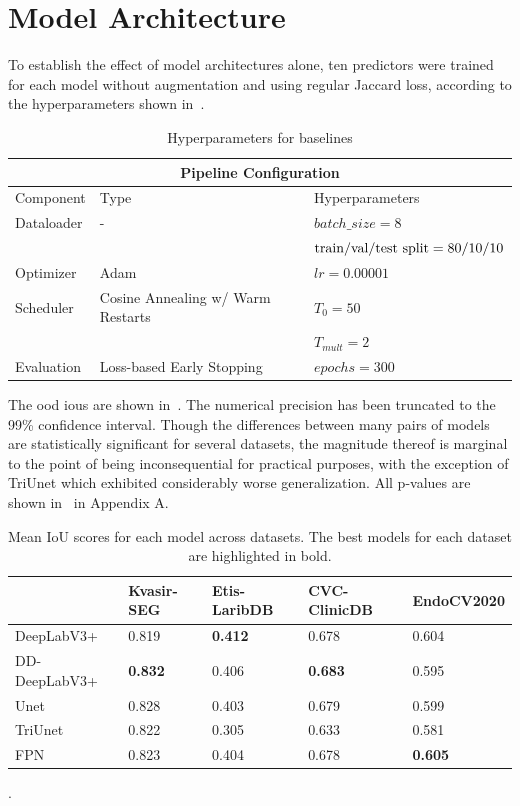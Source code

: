 \section{Model Architecture} \label{models}
To establish the effect of model architectures alone, ten predictors were trained for each model without augmentation and using regular Jaccard loss, according to the hyperparameters shown in~. 
\begin{table}[htb]
        \centering
        \begin{tabularx}{\linewidth}{llX}
        \toprule
        \multicolumn{3}{c}{\textbf{Pipeline Configuration}}\\
        \toprule
        Component & Type & Hyperparameters \\
        \midrule
        Dataloader & - & \(batch\_size = 8\) \\
        && \(\hbox{train/val/test split} = 80/10/10\)\\
        \midrule
        Optimizer & Adam & \(lr = 0.00001\)\\
        \midrule
        Scheduler & Cosine Annealing w/ Warm Restarts & \(T_0=50\) \\
        & & \(T_{mult}=2\) \\
        \midrule
        Evaluation & Loss-based Early Stopping & \(epochs=300\)\\
        \bottomrule
        \end{tabularx}
            \caption{Hyperparameters for baselines}
            \label{table:hyperparameters}
\end{table}

The \gls{ood} \glspl{iou} are shown in~. The numerical precision has been truncated to the 99\% confidence interval. Though the differences between many pairs of models are statistically significant for several datasets, the magnitude thereof is marginal to the point of being inconsequential for practical purposes, with the exception of TriUnet which exhibited considerably worse generalization. All p-values are shown in~ in Appendix A.

\begin{table}[htb]
    \centering
    \small
    \begin{tabularx}{\linewidth}{@{}lXXXX@{}}
    \toprule
    & Kvasir-SEG & Etis-LaribDB & CVC-ClinicDB & EndoCV2020 \\
    \midrule
    DeepLabV3+ & 0.819 & \textbf{0.412}  & 0.678 & 0.604 \\
    DD-DeepLabV3+ &\textbf{0.832} & 0.406 & \textbf{0.683} & 0.595 \\
    Unet & 0.828 & 0.403 & 0.679 & 0.599 \\
    TriUnet & 0.822 & 0.305 & 0.633 & 0.581 \\
    FPN& 0.823 & 0.404 &0.678 & \textbf{0.605}\\
    \bottomrule
    \end{tabularx}
.    \caption[Mean IoU scores for each model across datasets]{Mean IoU scores for each model across datasets. The best models for each dataset are highlighted in bold.}
    \label{tab:baseline_iou}
\end{table}

